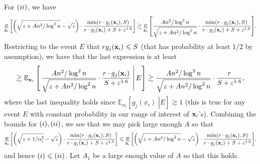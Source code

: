 \documentclass[10pt,a4paper]{article}
\newcommand\Expect[2]{{\mathop{\mathbb{E}}_{#1}\left[ {#2} \right]}}
\newcommand\cExpect[3]{{\mathbb{E}_{#1}\left[ \left. #3 \;\right\vert #2 \right]}}
\renewcommand\leq{\leqslant}
\newcommand{\rom}[1]{\uppercase\expandafter{\romannumeral #1\relax}}
\newcommand{\al}{\alpha}
\newcommand{\ve}{\varepsilon}
\def\gg{\gtrsim}
\begin{document}
    For $(\rom{2})$, we have
    \[
    \Expect{{\bf x}_i}{\left(\sqrt{z+An^2/\log^2 n}-\sqrt{z}\right)\cdot \frac{\min(r\cdot g_j({\bf x}_i),S)}{r\cdot g_j({\bf x}_i)+S+\ve^{1.6}}}
    \gg
     \Expect{{\bf x}_i}{\frac{An^2/\log^2 n}{\sqrt{z+An^2/\log^2 n}}\cdot \frac{\min(r\cdot g_j({\bf x}_i),S)}{r\cdot g_j({\bf x}_i)+S+\ve^{1.6}}}.
    \]
    Restricting to the event $E$ that $r g_j({\bf x}_i)\leq S$ (that has probability at least $1/2$ by assumption), we have that the last expression
    is at least
    \[
    \gg\cExpect{{\bf x}_i}{E}{\frac{An^2/\log^2 n}{\sqrt{z+An^2/\log^2 n}}\cdot \frac{r\cdot g_j({\bf x}_i)}{S+\ve^{1.6}}}
    \gg \frac{An^2/\log^2 n}{\sqrt{z+An^2/\log^2 n}}\cdot \frac{r}{S+\ve^{1.6}},
    \]
    where the last inequality holds since $\cExpect{\alpha_i}{E}{g_j(x_i)}\gg 1$ (this is true for any event $E$ with constant probability
    in our range of interest of ${\bf x}_i$'s). Combining the bounds for $(\rom{1}),(\rom{2})$, we see that we may pick large enough $A$ so
    that
    \[
    \Expect{{\bf x}_i}{\left(\sqrt{z+1/\al_i^2} -\sqrt{z}\right)\cdot \frac{\min(r\cdot g_j({\bf x}_i),S)}
	{r\cdot g_j({\bf x}_i)+S+\ve^{1.6}}}
\leq \Expect{{\bf x}_i}{\left(\sqrt{z+An^2/\log^2 n}-\sqrt{z}\right)\cdot \frac{\min(r\cdot g_j({\bf x}_i),S)}{r\cdot g_j({\bf x}_i)+S+\ve^{1.6}}},
    \]
    and hence $(\rom{1})\leq (\rom{2})$. Let $A_1$ be a large enough value of $A$ so that this holds.
\end{document}
